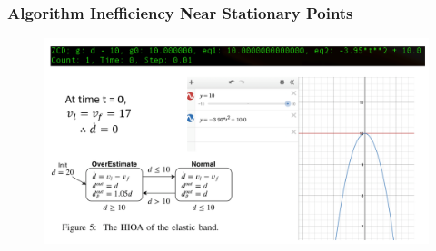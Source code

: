 \begin{frame}[c] \frametitle{Algorithm Inefficiency Near Stationary Points}
	\centering
	\begin{figure} 
		\includegraphics[width=1\textwidth]{./fig/inefficiency.png}
	\end{figure}
\end{frame}
